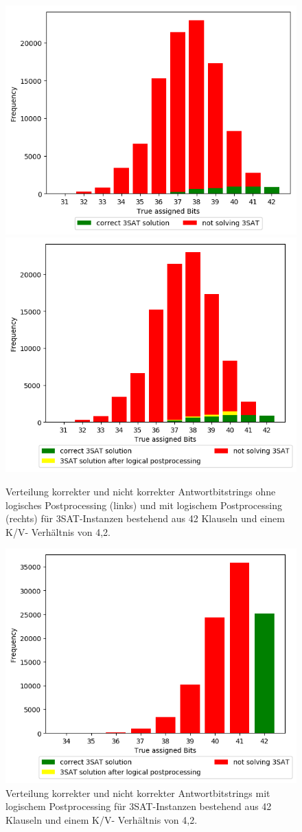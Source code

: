 
\begin{figure}
\includegraphics[width=.5\textwidth]{../material_2/Plots/42_4_2_def_engl_color_ohne_transform.png}%
\includegraphics[width=.5\textwidth]{../material_2/Plots/42_4_2_def_engl_color_mit_transform.png}
\caption{Verteilung korrekter und nicht korrekter Antwortbitstrings ohne logisches Postprocessing (links) und mit logischem Postprocessing (rechts) für 3SAT-Instanzen bestehend aus 42 Klauseln und einem K/V- Verhältnis von 4,2.} \label{fig:distr}
\end{figure}

\begin{figure}
\centering
\includegraphics[width=.8\textwidth]{../material_2/Plots/42_4_2_opt_engl_color_mit_transform.png}
\caption{Verteilung korrekter und nicht korrekter Antwortbitstrings mit logischem Postprocessing für 3SAT-Instanzen bestehend aus 42 Klauseln und einem K/V- Verhältnis von 4,2.} \label{fig:distr}
\end{figure}


